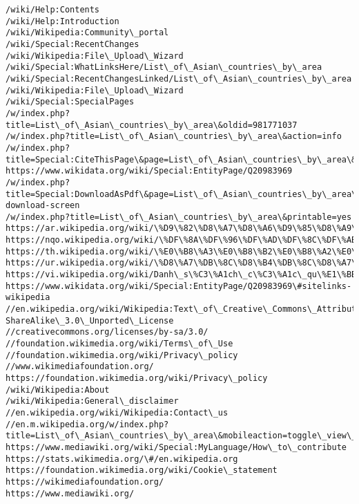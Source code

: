 \documentclass[11pt]{article}
\begin{document}
\begin{Verbatim}[commandchars=\\\{\}]
/wiki/Help:Contents
/wiki/Help:Introduction
/wiki/Wikipedia:Community\_portal
/wiki/Special:RecentChanges
/wiki/Wikipedia:File\_Upload\_Wizard
/wiki/Special:WhatLinksHere/List\_of\_Asian\_countries\_by\_area
/wiki/Special:RecentChangesLinked/List\_of\_Asian\_countries\_by\_area
/wiki/Wikipedia:File\_Upload\_Wizard
/wiki/Special:SpecialPages
/w/index.php?title=List\_of\_Asian\_countries\_by\_area\&oldid=981771037
/w/index.php?title=List\_of\_Asian\_countries\_by\_area\&action=info
/w/index.php?title=Special:CiteThisPage\&page=List\_of\_Asian\_countries\_by\_area\&id=981771037\&wpFormIdentifier=titleform
https://www.wikidata.org/wiki/Special:EntityPage/Q20983969
/w/index.php?title=Special:DownloadAsPdf\&page=List\_of\_Asian\_countries\_by\_area\&action=show-download-screen
/w/index.php?title=List\_of\_Asian\_countries\_by\_area\&printable=yes
https://ar.wikipedia.org/wiki/\%D9\%82\%D8\%A7\%D8\%A6\%D9\%85\%D8\%A9\_\%D8\%A7\%D9\%84\%D8\%AF\%D9\%88\%D9\%84\_\%D8\%A7\%D9\%84\%D8\%A2\%D8\%B3\%D9\%8A\%D9\%88\%D9\%8A\%D8\%A9\_\%D8\%AD\%D8\%B3\%D8\%A8\_\%D8\%A7\%D9\%84\%D9\%85\%D8\%B3\%D8\%A7\%D8\%AD\%D8\%A9
https://nqo.wikipedia.org/wiki/\%DF\%8A\%DF\%96\%DF\%AD\%DF\%8C\%DF\%AB\_\%DF\%96\%DF\%A1\%DF\%8A\%DF\%A3\%DF\%8A\_\%DF\%9F\%DF\%8E\%DF\%AC\_\%DF\%9E\%DF\%8A\%DF\%AC\_\%DF\%93\%DF\%8D\%DF\%B2\%DF\%AC\_\%DF\%9D\%DF\%8A\%DF\%B2\%DF\%AC\%DF\%9D\%DF\%98\%DF\%8A\_\%DF\%A1\%DF\%8A\%DF\%AC
https://th.wikipedia.org/wiki/\%E0\%B8\%A3\%E0\%B8\%B2\%E0\%B8\%A2\%E0\%B8\%8A\%E0\%B8\%B7\%E0\%B9\%88\%E0\%B8\%AD\%E0\%B8\%9B\%E0\%B8\%A3\%E0\%B8\%B0\%E0\%B9\%80\%E0\%B8\%97\%E0\%B8\%A8\%E0\%B9\%83\%E0\%B8\%99\%E0\%B8\%97\%E0\%B8\%A7\%E0\%B8\%B5\%E0\%B8\%9B\%E0\%B9\%80\%E0\%B8\%AD\%E0\%B9\%80\%E0\%B8\%8A\%E0\%B8\%B5\%E0\%B8\%A2\%E0\%B9\%80\%E0\%B8\%A3\%E0\%B8\%B5\%E0\%B8\%A2\%E0\%B8\%87\%E0\%B8\%95\%E0\%B8\%B2\%E0\%B8\%A1\%E0\%B8\%9E\%E0\%B8\%B7\%E0\%B9\%89\%E0\%B8\%99\%E0\%B8\%97\%E0\%B8\%B5\%E0\%B9\%88
https://ur.wikipedia.org/wiki/\%D8\%A7\%DB\%8C\%D8\%B4\%DB\%8C\%D8\%A7\%D8\%A6\%DB\%8C\_\%D9\%85\%D9\%85\%D8\%A7\%D9\%84\%DA\%A9\_\%DA\%A9\%DB\%8C\_\%D9\%81\%DB\%81\%D8\%B1\%D8\%B3\%D8\%AA\_\%D8\%A8\%D9\%84\%D8\%AD\%D8\%A7\%D8\%B8\_\%D8\%B1\%D9\%82\%D8\%A8\%DB\%81
https://vi.wikipedia.org/wiki/Danh\_s\%C3\%A1ch\_c\%C3\%A1c\_qu\%E1\%BB\%91c\_gia\_Ch\%C3\%A2u\_\%C3\%81\_theo\_di\%E1\%BB\%87n\_t\%C3\%ADch
https://www.wikidata.org/wiki/Special:EntityPage/Q20983969\#sitelinks-wikipedia
//en.wikipedia.org/wiki/Wikipedia:Text\_of\_Creative\_Commons\_Attribution-ShareAlike\_3.0\_Unported\_License
//creativecommons.org/licenses/by-sa/3.0/
//foundation.wikimedia.org/wiki/Terms\_of\_Use
//foundation.wikimedia.org/wiki/Privacy\_policy
//www.wikimediafoundation.org/
https://foundation.wikimedia.org/wiki/Privacy\_policy
/wiki/Wikipedia:About
/wiki/Wikipedia:General\_disclaimer
//en.wikipedia.org/wiki/Wikipedia:Contact\_us
//en.m.wikipedia.org/w/index.php?title=List\_of\_Asian\_countries\_by\_area\&mobileaction=toggle\_view\_mobile
https://www.mediawiki.org/wiki/Special:MyLanguage/How\_to\_contribute
https://stats.wikimedia.org/\#/en.wikipedia.org
https://foundation.wikimedia.org/wiki/Cookie\_statement
https://wikimediafoundation.org/
https://www.mediawiki.org/

    \end{Verbatim}
\end{document}

